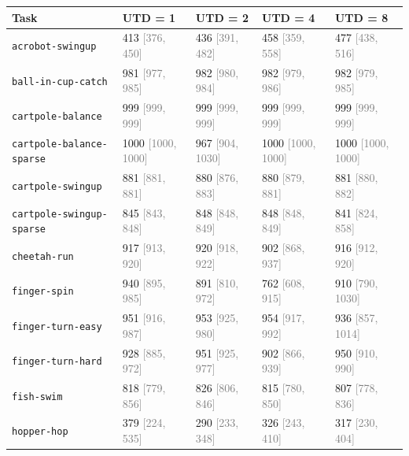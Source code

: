 \begin{tabular}{lllll}
\toprule
\textbf{Task} & \textbf{UTD = 1} & \textbf{UTD = 2} & \textbf{UTD = 4} & \textbf{UTD = 8} \\
\midrule
\texttt{acrobot-swingup} & 413 \textcolor{gray}{[376, 450]} & 436 \textcolor{gray}{[391, 482]} & 458 \textcolor{gray}{[359, 558]} & 477 \textcolor{gray}{[438, 516]} \\
\texttt{ball-in-cup-catch} & 981 \textcolor{gray}{[977, 985]} & 982 \textcolor{gray}{[980, 984]} & 982 \textcolor{gray}{[979, 986]} & 982 \textcolor{gray}{[979, 985]} \\
\texttt{cartpole-balance} & 999 \textcolor{gray}{[999, 999]} & 999 \textcolor{gray}{[999, 999]} & 999 \textcolor{gray}{[999, 999]} & 999 \textcolor{gray}{[999, 999]} \\
\texttt{cartpole-balance-sparse} & 1000 \textcolor{gray}{[1000, 1000]} & 967 \textcolor{gray}{[904, 1030]} & 1000 \textcolor{gray}{[1000, 1000]} & 1000 \textcolor{gray}{[1000, 1000]} \\
\texttt{cartpole-swingup} & 881 \textcolor{gray}{[881, 881]} & 880 \textcolor{gray}{[876, 883]} & 880 \textcolor{gray}{[879, 881]} & 881 \textcolor{gray}{[880, 882]} \\
\texttt{cartpole-swingup-sparse} & 845 \textcolor{gray}{[843, 848]} & 848 \textcolor{gray}{[848, 849]} & 848 \textcolor{gray}{[848, 849]} & 841 \textcolor{gray}{[824, 858]} \\
\texttt{cheetah-run} & 917 \textcolor{gray}{[913, 920]} & 920 \textcolor{gray}{[918, 922]} & 902 \textcolor{gray}{[868, 937]} & 916 \textcolor{gray}{[912, 920]} \\
\texttt{finger-spin} & 940 \textcolor{gray}{[895, 985]} & 891 \textcolor{gray}{[810, 972]} & 762 \textcolor{gray}{[608, 915]} & 910 \textcolor{gray}{[790, 1030]} \\
\texttt{finger-turn-easy} & 951 \textcolor{gray}{[916, 987]} & 953 \textcolor{gray}{[925, 980]} & 954 \textcolor{gray}{[917, 992]} & 936 \textcolor{gray}{[857, 1014]} \\
\texttt{finger-turn-hard} & 928 \textcolor{gray}{[885, 972]} & 951 \textcolor{gray}{[925, 977]} & 902 \textcolor{gray}{[866, 939]} & 950 \textcolor{gray}{[910, 990]} \\
\texttt{fish-swim} & 818 \textcolor{gray}{[779, 856]} & 826 \textcolor{gray}{[806, 846]} & 815 \textcolor{gray}{[780, 850]} & 807 \textcolor{gray}{[778, 836]} \\
\texttt{hopper-hop} & 379 \textcolor{gray}{[224, 535]} & 290 \textcolor{gray}{[233, 348]} & 326 \textcolor{gray}{[243, 410]} & 317 \textcolor{gray}{[230, 404]} \\

\end{tabular}
